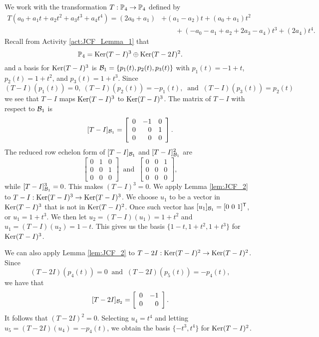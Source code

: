 \begin{example} \label{ex:JCF_Lemma_2_2} We work with the transformation $T:\mathbb{P}_4 \to \mathbb{P}_4$ defined by 
\begin{align*}
T\left(a_0+a_1t+a_2t^2+a_3t^3+a_4t^4\right) = (2a_0+a_1) &+ (a_1-a_2)t + (a_0+a_1)t^2 \\
	&\qquad + (-a_0-a_1+a_2+2a_3-a_4)t^3 + (2a_4)t^4.
\end{align*}
Recall from Activity \ref{act:JCF_Lemma_1} that 
\[\mathbb{P}_4 = \text{Ker}(T-I)^{3} \oplus \text{Ker}(T-2 I)^{2}.\]
and a basis for $\text{Ker}(T-I)^3$ is $\mathcal{B}_1 = \{p_1(t), p_2(t), p_3(t)\}$ with $p_1(t) = -1+t$, $p_2(t) = 1+t^2$, and $p_3(t)= 1+t^3$. Since 
 \[(T-I)(p_1(t)) = 0, \ (T-I)(p_2(t)) = -p_1(t), \ \text{ and } \ (T-I)(p_3(t)) = p_2(t)\]
we see that $T-I$ maps $\text{Ker}(T-I)^3$ to $\text{Ker}(T-I)^3$. The matrix of $T-I$ with respect to $\mathcal{B}_1$ is 
 \[[T-I]_{\mathcal{B}_1} = \left[ \begin{array}{crc} 0&-1&0 \\ 0&0&1 \\ 0&0&0 \end{array} \right].\]
The reduced row echelon form of $[T-I]_{\mathcal{B}_1}$ and $[T-I]_{\mathcal{B}_1}^2$ are 
\[\left[ \begin{array}{ccc} 0&1&0 \\ 0&0&1 \\ 0&0&0 \end{array} \right] \ \text{ and } \ \left[ \begin{array}{ccr} 0&0&1 \\ 0&0&0 \\ 0&0&0 \end{array} \right],\]
while $[T-I]_{\mathcal{B}_1}^3 = 0$. This makes $(T-I)^3 = 0$. We apply Lemma \ref{lem:JCF_2} to $T-I : \text{Ker}(T-I)^3 \to \text{Ker}(T-I)^3$. We choose $u_1$ to be a vector in $\text{Ker}(T-I)^3$ that is not in $\text{Ker}(T-I)^2$. Once such vector has $[u_1]_{\CB_1} = [0 \ 0 \ 1]^{\tr}$, or $u_1=1+t^3$. We then let $u_2 = (T-I)(u_1) = 1+t^2$ and $u_1 = (T-I)(u_2) = 1-t$. This gives us the basis $\{1-t, 1+t^2, 1+t^3\}$ for $\text{Ker}(T-I)^3$. 

We can also apply Lemma \ref{lem:JCF_2} to $T-2I : \text{Ker}(T-I)^2 \to \text{Ker}(T-I)^2$. Since 
\[(T-2I)(p_4(t)) = 0 \ \text{ and } \ (T-2I)(p_5(t)) = -p_4(t),\]
we have that 
\[[T-2I]_{\mathcal{B}_2} = \left[ \begin{array}{cr} 0&-1 \\ 0&0 \end{array} \right].\]
It follows that $(T-2I)^2 = 0$. Selecting $u_4 = t^4$ and letting $u_5 = (T-2I)(u_4) = -p_4(t)$, we obtain the basis $\{-t^3, t^4\}$ for $\text{Ker}(T-I)^2$. 


\end{example}

